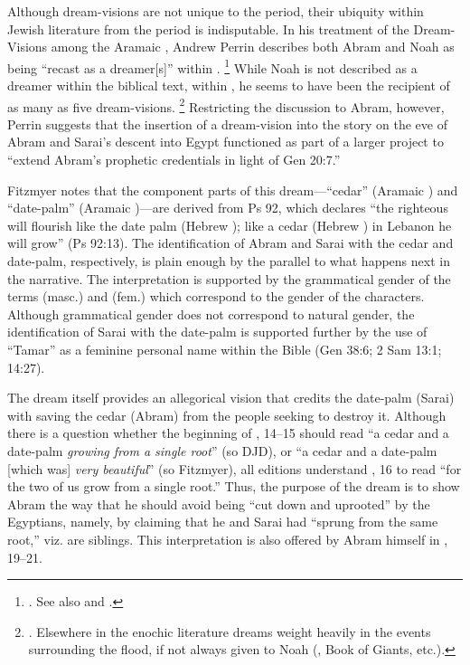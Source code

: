 Although dream-visions are not unique to the \secondtemple period, their ubiquity within Jewish literature from the \secondtemple period is indisputable. In his treatment of the Dream-Visions among the Aramaic \dss, Andrew Perrin describes both Abram and Noah as being ``recast as a dreamer[s]'' within \ga.%
    \footnote{\Cite[52--57]{perrin2015}. See also 
        \cite{eshel_klostergaard-etal2009} and 
        \cite{machiela_falk-etal2010}.}
While Noah is not described as a dreamer within the biblical text, within \ga, he seems to have been the recipient of as many as five dream-visions.%
    \footnote{\Cite[53]{perrin2015}. Elsewhere in the enochic literature dreams weight heavily in the events surrounding the flood, if not always given to Noah (\firstenoch, Book of Giants, etc.).}
Restricting the discussion to Abram, however, Perrin suggests that the insertion of a dream-vision into the story on the eve of Abram and Sarai's descent into Egypt functioned as part of a larger project to ``extend Abram's prophetic credentials in light of Gen 20:7.''%
    \autocite[55]{perrin2015} 

Fitzmyer notes that the component parts of this dream---``cedar'' (Aramaic ) and ``date-palm'' (Aramaic )---are derived from Ps 92, which declares ``the righteous will flourish like the date palm (Hebrew ); like a cedar (Hebrew ) in Lebanon he will grow'' (Ps 92:13). The identification of Abram and Sarai with the cedar and date-palm, respectively, is plain enough by the parallel to what happens next in the narrative. The interpretation is supported by the grammatical gender of the terms  (masc.) and  (fem.) which correspond to the gender of the characters. Although grammatical gender does not correspond to natural gender, the identification of Sarai with the date-palm is supported further by the use of ``Tamar'' as a feminine personal name within the Bible (Gen 38:6; 2 Sam 13:1; 14:27).

The dream itself provides an allegorical vision that credits the date-palm (Sarai) with saving the cedar (Abram) from the people seeking to destroy it. Although there is a question whether the beginning of , 14--15 should read  ``a cedar and a date-palm \emph{growing from a single root}'' (so DJD), or  ``a cedar and a date-palm [which was] \emph{very beautiful}'' (so Fitzmyer), all editions understand , 16 to read  ``for the two of us grow from a single root.'' Thus, the purpose of the dream  is to show Abram the way that he should avoid being ``cut down and uprooted'' by the Egyptians, namely, by claiming that he and Sarai had ``sprung from the same root,'' viz. are siblings. This interpretation is also offered by Abram himself in , 19--21.

